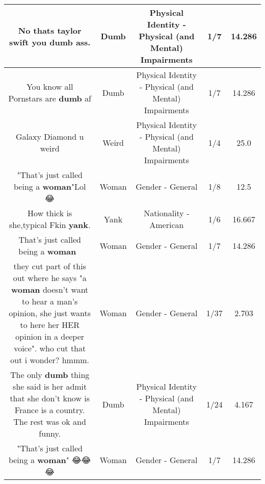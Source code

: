\documentclass[11pt]{article}
\newlength\mylength
\begin{document}
\begin{center}
\begin{longtable}{|C{.65\mylength}|C{.30\mylength}|C{.12\mylength}|C{.12\mylength}|C{.12\mylength}|}
  \small No thats taylor swift you \textbf{dumb} ass.\normalsize   & Dumb & Physical Identity - Physical (and Mental) Impairments & 1/7 & 14.286 \\  \hline
  \small You know all Pornstars are \textbf{dumb} af\normalsize   & Dumb & Physical Identity - Physical (and Mental) Impairments & 1/7 & 14.286 \\  \hline
  \small Galaxy Diamond u weird\normalsize   & Weird & Physical Identity - Physical (and Mental) Impairments & 1/4 & 25.0 \\  \hline
  \small "That's just called being a \textbf{woman}"Lol 😂\normalsize   & Woman & Gender - General & 1/8 & 12.5 \\  \hline
  \small How thick is she,typical Fkin \textbf{yank}.\normalsize   & Yank & Nationality - American & 1/6 & 16.667 \\  \hline
  \small That's just called being a \textbf{woman} 🤣\normalsize   & Woman & Gender - General & 1/7 & 14.286 \\  \hline
  \small they cut part of this out where he says "a \textbf{woman} doesn't want to hear a man's opinion, she just wants to here her HER opinion in a deeper voice".  who cut that out i wonder?  hmmm.\normalsize   & Woman & Gender - General & 1/37 & 2.703 \\  \hline
  \small The only \textbf{dumb} thing she said is her admit that she don't know is France is a country. The rest was ok and funny.\normalsize   & Dumb & Physical Identity - Physical (and Mental) Impairments & 1/24 & 4.167 \\  \hline
  \small "That's just called being a \textbf{woman}" 😂😂😂\normalsize   & Woman & Gender - General & 1/7 & 14.286 \\  \hline

\end{longtable}
\end{center}
\end{document}
